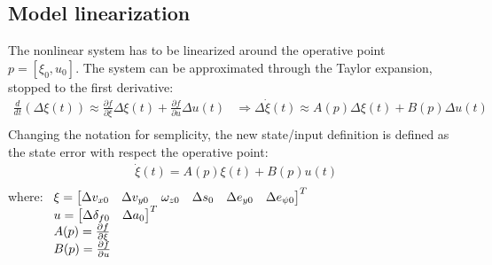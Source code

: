 \documentclass[12pt]{article}
\begin{document}
    \subsection{Model linearization}
        The nonlinear system has to be linearized around the 
        operative point $p = [\xi_0, u_0]$.
        The system can be approximated through the Taylor expansion, stopped
        to the first derivative:
        \begin{equation}
            \begin{aligned}
                \frac{d}{dt}(\Delta \xi(t)) \approx \frac{\partial f}{\partial \xi} \Delta \xi(t) + \frac{\partial f}{\partial u} \Delta u(t)
                & \Rightarrow 
                \Delta \dot{\xi}(t) \approx A(p) \Delta \xi(t) + B(p) \Delta u(t) \\
            \end{aligned}
        \end{equation}
        Changing the notation for semplicity, the new state/input definition is defined 
        as the state error with respect the operative point:
        \begin{equation}
            \begin{aligned}
                & \dot{\xi}(t) = A(p) \xi(t) + B(p) u(t) \\
            \end{aligned}
        \end{equation}
        where:  $ \begin{array}[t]{l}
                    \xi = \begin{bmatrix} \Delta v_{x0} & \Delta v_{y0} & \omega_{z0} & \Delta s_0 & \Delta e_{y0} & \Delta e_{\psi 0} \end{bmatrix}^T \\
                    u = \begin{bmatrix} \Delta \delta_{f0} & \Delta a_0 \end{bmatrix}^T \\               
                    A(p) = \frac{\partial f}{\partial \xi} \\
                    B(p) = \frac{\partial f}{\partial u}   \\   
                \end{array} $ \\
\end{document}
